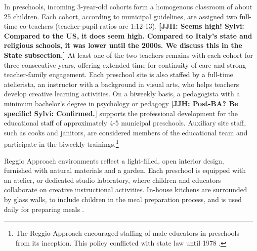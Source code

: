 In preschools, incoming 3-year-old cohorts form a homogenous classroom of about 25 children. Each cohort, according to municipal guidelines, are assigned two full-time co-teachers (teacher-pupil ratios are 1:12-13). \textbf{[JJH: Seems high! Sylvi: Compared to the US, it does seem high. Compared to Italy's state and religious schools, it was lower until the 2000s. We discuss this in the State subsection.]} At least one of the two teachers remains with each cohort for three consecutive years, offering extended time for continuity of care and strong teacher-family engagement. Each preschool site is also staffed by a full-time atelierista, an instructor with a background in visual arts, who helps teachers develop creative learning activities. On a biweekly basis, a pedagogista with a minimum bachelor's degree in psychology or pedagogy \textbf{[JJH: Post-BA? Be specific! Sylvi: Confirmed.]} supports the professional development for the educational staff of approximately 4-5 municipal preschools. Auxiliary site staff, such as cooks and janitors, are considered members of the educational team and participate in the biweekly trainings.\footnote{The Reggio Approach encouraged staffing of male educators in preschools from its inception. This policy conflicted with state law until 1978 \citep{Hohnerlein_2015_Development-and-Diffusion}.}

Reggio Approach environments reflect a light-filled, open interior design, furnished with natural materials and a garden. Each preschool is equipped with an atelier, or dedicated studio laboratory, where children and educators collaborate on creative instructional activities. In-house kitchens are surrounded by glass walls, to include children in the meal preparation process, and is used daily for preparing meals \citep{Rinaldi_2006_ReggioEmilia_BOOK,Vecchi_2010_ReggioEmilia_BOOK}. 

